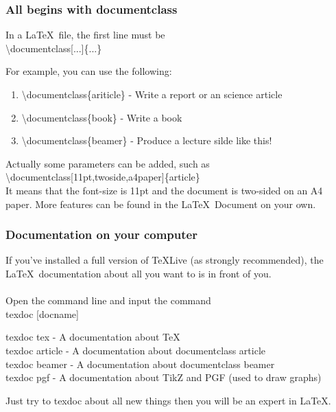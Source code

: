 \documentclass{beamer}
\begin{document}
\begin{frame}
	\frametitle{All begins with documentclass}
	\begin{definition}
		In a \LaTeX\ file, the {\color{blue}first} line must be \\
		{\color{red}\textbackslash documentclass[...]\{...\}}	
	\end{definition}
	For example, you can use the following:\\
	\begin{enumerate}
		\item {\color{red}\textbackslash documentclass\{ariticle\}} - Write a report or an science article
		\item {\color{red}\textbackslash documentclass\{book\}} - Write a book
		\item {\color{red}\textbackslash documentclass\{beamer\}} - Produce a lecture silde like this!
	\end{enumerate}
	Actually some parameters can be added, such as\\
	{\color{red}\textbackslash documentclass[11pt,twoside,a4paper]\{article\}}\\
	It means that the font-size is 11pt and the document is two-sided on an A4 paper. More features can be found in the \LaTeX\ Document on your own.
\end{frame}

\begin{frame}
	\frametitle{Documentation on your computer}
	If you've installed a full version of TeXLive (as strongly recommended), the \LaTeX\ documentation about all you want to is in front of you.\\
	\ \\
	Open the command line and input the command\\
	{\color{red}texdoc [docname]}
	\begin{example}
		{\color{red}texdoc tex} - A documentation about {\color{blue}TeX}\\
		{\color{red}texdoc article} - A documentation about documentclass {\color{blue}article}\\
		{\color{red}texdoc beamer} - A documentation about documentclass {\color{blue}beamer}\\
		{\color{red}texdoc pgf} - A documentation about {\color{blue}TikZ} and {\color{blue}PGF} (used to draw graphs)\\
	\end{example}
	Just try to {\color{red}texdoc} about all new things then you will be an expert in \LaTeX.
\end{frame}
\end{document}
